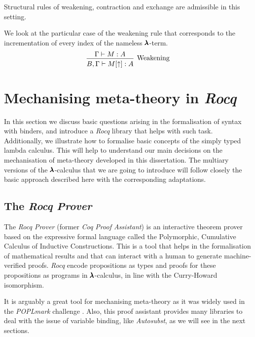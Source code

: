 \begin{claim}
  \label{nameless_typing_claim}  
  Structural rules of weakening, contraction and exchange are admissible in this setting.
\end{claim}

We look at the particular case of the weakening rule that corresponds to the incrementation of every index of the nameless $\pmb{\lambda}$-term.
\[
  \begin{prooftree}
    \hypo{ \Gamma \vdash M:A }
    \infer1[Weakening]{ B, \Gamma \vdash M[\uparrow]:A } 
  \end{prooftree}
\]


\section{Mechanising meta-theory in \textit{Rocq}}

In this section we discuss basic questions arising in the formalisation of syntax with binders, and introduce a \textit{Rocq} library that helps with such task.
Additionally, we illustrate how to formalise basic concepts of the simply typed lambda calculus.
This will help to understand our main decisions on the mechanisation of meta-theory developed in this dissertation.
The multiary versions of the $\pmb{\lambda}$-calculus that we are going to introduce will follow closely the basic approach described here with the corresponding adaptations.

\subsection{The \textit{Rocq Prover}}

The \textit{Rocq Prover} (former \textit{Coq Proof Assistant}) \cite{RocqManual} is an interactive theorem prover based on the expressive formal language called the Polymorphic, Cumulative Calculus of Inductive Constructions.
This is a tool that helps in the formalisation of mathematical results and that can interact with a human to generate machine-verified proofs.
\textit{Rocq} encode propositions as types and proofs for these propositions as programs in $\pmb{\lambda}$-calculus, in line with the Curry-Howard isomorphism.

It is arguably a great tool for mechanising meta-theory as it was widely used in the \textit{POPLmark} challenge \cite{POPLmark}.
Also, this proof assistant provides many libraries to deal with the issue of variable binding, like \textit{Autosubst}, as we will see in the next sections.

